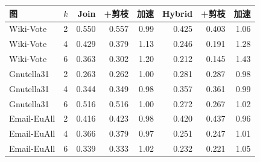 {\fontsize{8.5}{11}\selectfont\centering\begin{tabular*}{\textwidth}{@{\extracolsep{\fill}}llrrrrrr@{}}\toprule
图 & $k$ & Join & +剪枝 & 加速 & Hybrid & +剪枝 & 加速\\\midrule
Wiki-Vote & 2 & 0.550 & 0.557 & 0.99 & 0.425 & 0.403 & 1.06\\
Wiki-Vote & 4 & 0.429 & 0.379 & 1.13 & 0.246 & 0.191 & 1.28\\
Wiki-Vote & 6 & 0.363 & 0.302 & 1.20 & 0.212 & 0.145 & 1.43\\
Gnutella31 & 2 & 0.263 & 0.262 & 1.00 & 0.281 & 0.287 & 0.98\\
Gnutella31 & 4 & 0.344 & 0.349 & 0.98 & 0.357 & 0.361 & 0.99\\
Gnutella31 & 6 & 0.516 & 0.516 & 1.00 & 0.272 & 0.267 & 1.02\\
Email-EuAll & 2 & 0.416 & 0.423 & 0.98 & 0.420 & 0.437 & 0.96\\
Email-EuAll & 4 & 0.366 & 0.379 & 0.97 & 0.251 & 0.247 & 1.01\\
Email-EuAll & 6 & 0.339 & 0.333 & 1.02 & 0.232 & 0.221 & 1.05\\
\bottomrule\end{tabular*}\par}
